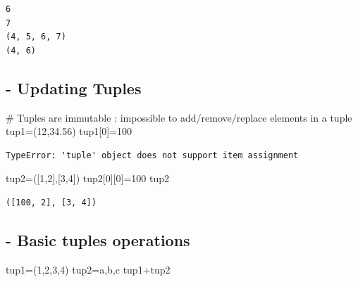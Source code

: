 \documentclass[
  letterpaper,
  DIV=11,
  numbers=noendperiod]{scrreprt}
\newenvironment{Shaded}{\begin{snugshade}}{\end{snugshade}}
\newcommand{\CommentTok}[1]{\textcolor[rgb]{0.37,0.37,0.37}{#1}}
\newcommand{\DecValTok}[1]{\textcolor[rgb]{0.68,0.00,0.00}{#1}}
\newcommand{\FloatTok}[1]{\textcolor[rgb]{0.68,0.00,0.00}{#1}}
\newcommand{\NormalTok}[1]{\textcolor[rgb]{0.00,0.23,0.31}{#1}}
\newcommand{\OperatorTok}[1]{\textcolor[rgb]{0.37,0.37,0.37}{#1}}
\newcommand{\StringTok}[1]{\textcolor[rgb]{0.13,0.47,0.30}{#1}}
\begin{document}
\begin{verbatim}
6
7
(4, 5, 6, 7)
(4, 6)
\end{verbatim}

\subsection{- Updating Tuples}\label{updating-tuples}

\begin{Shaded}
\begin{Highlighting}[]
\CommentTok{\# Tuples are immutable : impossible to add/remove/replace elements in a tuple}
\NormalTok{tup1}\OperatorTok{=}\NormalTok{(}\DecValTok{12}\NormalTok{,}\FloatTok{34.56}\NormalTok{)}
\NormalTok{tup1[}\DecValTok{0}\NormalTok{]}\OperatorTok{=}\DecValTok{100}
\end{Highlighting}
\end{Shaded}

\begin{verbatim}
TypeError: 'tuple' object does not support item assignment
\end{verbatim}

\begin{Shaded}
\begin{Highlighting}[]
\NormalTok{tup2}\OperatorTok{=}\NormalTok{([}\DecValTok{1}\NormalTok{,}\DecValTok{2}\NormalTok{],[}\DecValTok{3}\NormalTok{,}\DecValTok{4}\NormalTok{])}
\NormalTok{tup2[}\DecValTok{0}\NormalTok{][}\DecValTok{0}\NormalTok{]}\OperatorTok{=}\DecValTok{100}
\NormalTok{tup2}
\end{Highlighting}
\end{Shaded}

\begin{verbatim}
([100, 2], [3, 4])
\end{verbatim}

\subsection{- Basic tuples operations}\label{basic-tuples-operations}

\begin{Shaded}
\begin{Highlighting}[]
\NormalTok{tup1}\OperatorTok{=}\NormalTok{(}\DecValTok{1}\NormalTok{,}\DecValTok{2}\NormalTok{,}\DecValTok{3}\NormalTok{,}\DecValTok{4}\NormalTok{)}
\NormalTok{tup2}\OperatorTok{=}\StringTok{\textquotesingle{}a\textquotesingle{}}\NormalTok{,}\StringTok{\textquotesingle{}b\textquotesingle{}}\NormalTok{,}\StringTok{\textquotesingle{}c\textquotesingle{}}
\NormalTok{tup1}\OperatorTok{+}\NormalTok{tup2}
\end{Highlighting}
\end{Shaded}
\end{document}

